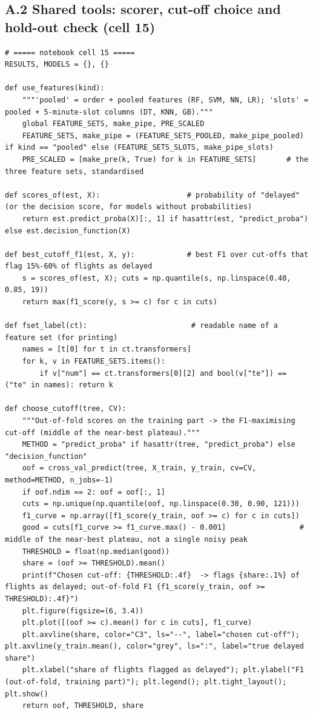 \documentclass[12pt,a4paper]{article}
\begin{document}
\subsection*{A.2 Shared tools: scorer, cut-off choice and hold-out check (cell 15)}
\begin{lstlisting}[style=code]
# ===== notebook cell 15 =====
RESULTS, MODELS = {}, {}

def use_features(kind):
    """'pooled' = order + pooled features (RF, SVM, NN, LR); 'slots' = pooled + 5-minute-slot columns (DT, KNN, GB)."""
    global FEATURE_SETS, make_pipe, PRE_SCALED
    FEATURE_SETS, make_pipe = (FEATURE_SETS_POOLED, make_pipe_pooled) if kind == "pooled" else (FEATURE_SETS_SLOTS, make_pipe_slots)
    PRE_SCALED = [make_pre(k, True) for k in FEATURE_SETS]       # the three feature sets, standardised

def scores_of(est, X):                    # probability of "delayed" (or the decision score, for models without probabilities)
    return est.predict_proba(X)[:, 1] if hasattr(est, "predict_proba") else est.decision_function(X)

def best_cutoff_f1(est, X, y):            # best F1 over cut-offs that flag 15%-60% of flights as delayed
    s = scores_of(est, X); cuts = np.quantile(s, np.linspace(0.40, 0.85, 19))
    return max(f1_score(y, s >= c) for c in cuts)

def fset_label(ct):                        # readable name of a feature set (for printing)
    names = [t[0] for t in ct.transformers]
    for k, v in FEATURE_SETS.items():
        if v["num"] == ct.transformers[0][2] and bool(v["te"]) == ("te" in names): return k

def choose_cutoff(tree, CV):
    """Out-of-fold scores on the training part -> the F1-maximising cut-off (middle of the near-best plateau)."""
    METHOD = "predict_proba" if hasattr(tree, "predict_proba") else "decision_function"
    oof = cross_val_predict(tree, X_train, y_train, cv=CV, method=METHOD, n_jobs=-1)
    if oof.ndim == 2: oof = oof[:, 1]
    cuts = np.unique(np.quantile(oof, np.linspace(0.30, 0.90, 121)))
    f1_curve = np.array([f1_score(y_train, oof >= c) for c in cuts])
    good = cuts[f1_curve >= f1_curve.max() - 0.001]                 # middle of the near-best plateau, not a single noisy peak
    THRESHOLD = float(np.median(good))
    share = (oof >= THRESHOLD).mean()
    print(f"Chosen cut-off: {THRESHOLD:.4f}  -> flags {share:.1%} of flights as delayed; out-of-fold F1 {f1_score(y_train, oof >= THRESHOLD):.4f}")
    plt.figure(figsize=(6, 3.4))
    plt.plot([(oof >= c).mean() for c in cuts], f1_curve)
    plt.axvline(share, color="C3", ls="--", label="chosen cut-off"); plt.axvline(y_train.mean(), color="grey", ls=":", label="true delayed share")
    plt.xlabel("share of flights flagged as delayed"); plt.ylabel("F1 (out-of-fold, training part)"); plt.legend(); plt.tight_layout(); plt.show()
    return oof, THRESHOLD, share


\end{lstlisting}
\end{document}
